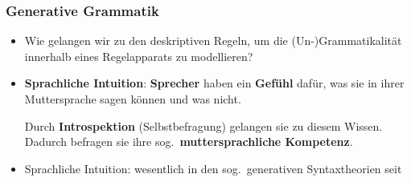 \begin{frame}
\frametitle{Generative Grammatik}

\begin{minipage}[c]{0.57\textwidth}
\begin{itemize}
	\item<1-> Wie gelangen wir zu den deskriptiven Regeln, um die (Un-)Grammatikalität innerhalb eines Regelapparats zu modellieren?


	\medskip
	\item<2->  \textbf{Sprachliche Intuition}: \textbf{Sprecher} haben ein \textbf{Gefühl} dafür, was sie in ihrer Muttersprache sagen können und was nicht.
	
	Durch \textbf{Introspektion} (Selbstbefragung) gelangen sie zu diesem Wissen. Dadurch befragen sie ihre sog.\ \textbf{muttersprachliche Kompetenz}.
	
	
	\medskip 
	\item<3-> Sprachliche Intuition: wesentlich in den sog.\ generativen Syntaxtheorien seit \citet{Chomsky57x}
	

\end{itemize}
\end{minipage}
\begin{minipage}[c]{0.40\textwidth}

\begin{figure}
	\centering
{}
\end{figure}

\end{minipage}

\end{frame}


